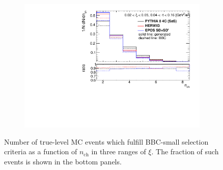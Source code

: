 \begin{figure}[b!]
\begin{subfigure}{.49\textwidth}
		\includegraphics[width=\textwidth,page=3]{chapters/chrgSTAR/img/bbcCorrection/xi_bbc.pdf}
	\end{subfigure}
	\vspace{-0.2cm}
	\begin{minipage}{.49\textwidth}
		\caption{Number of true-level MC events which fulfill BBC-small selection criteria  as a function of $n_\textrm{ch}$ in three ranges of $\xi$. The fraction of such events is shown in the bottom panels.}
		\label{fig:bbcCorection_nch}
	\end{minipage}
	\vspace{-0.3cm}
\end{figure}

